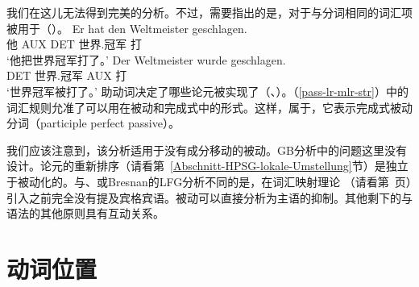 我们在这儿无法得到完美的分析。不过，需要指出的是，对于与分词相同的词汇项被用于（）。
\eal
\ex 
\gll Er hat den Weltmeister geschlagen.\\
	 他 AUX DET 世界.冠军 打\\
\glt `他把世界冠军打了。'
\ex 
\gll Der Weltmeister wurde geschlagen.\\
	 DET 世界.冠军 AUX 打\\
\glt `世界冠军被打了。'
\zl
助动词决定了哪些论元被实现了（\citealp{Haider86}、\citealp[Chapter~17]{MuellerLehrbuch1}）。（\ref{pass-lr-mlr-str}）中的词汇规则允准了可以用在被动和完成式中的形式。这样，\vformv 属于，它表示完成式被动分词（participle perfect passive）。

我们应该注意到，该分析适用于没有成分移动的被动。GB分析\indexgb 中的问题这里没有设计。论元的重新排序（请看第~\ref{Abschnitt-HPSG-lokale-Umstellung}节）是独立于被动化的。与\gpsg 、\cg 或Bresnan的LFG分析不同的是，在词汇映射理论 （请看第~\pageref{page-LMT}页）引入之前完全没有提及宾格宾语。被动可以直接分析为主语的抑制。其他剩下的与语法的其他原则具有互动关系。

\section{动词位置}
\label{Abschnitt-Verbstellung-HPSG}

